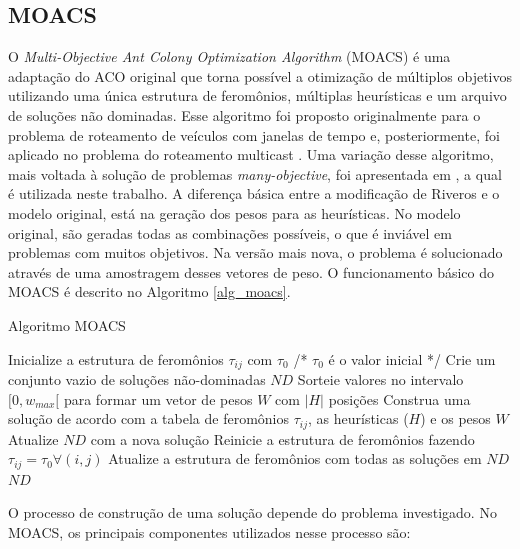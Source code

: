 \subsection{MOACS}

O \textit{Multi-Objective Ant Colony Optimization Algorithm} (MOACS) \cite{Baran2003} é uma adaptação do ACO original que torna possível a otimização de múltiplos objetivos utilizando uma única estrutura de feromônios, múltiplas heurísticas e um arquivo de soluções não dominadas. Esse algoritmo foi proposto originalmente para o problema de roteamento de veículos com janelas de tempo e, posteriormente, foi aplicado no problema do roteamento multicast \cite{Pinto2005}. Uma variação desse algoritmo, mais voltada à solução de problemas \textit{many-objective}, foi apresentada em \cite{Riveros2016}, a qual é utilizada neste trabalho. A diferença básica entre a modificação de Riveros e o modelo original, está na geração dos pesos para as heurísticas. No modelo original, são geradas todas as combinações possíveis, o que é inviável em problemas com muitos objetivos. Na versão mais nova, o problema é solucionado através de uma amostragem desses vetores de peso. O funcionamento básico do MOACS é descrito no Algoritmo \ref{alg_moacs}.

\begin{algorithm}
	\caption{Algoritmo MOACS}
	\label{alg_moacs}
	\begin{algorithmic}[1]
		\State Inicialize a estrutura de feromônios $\tau_{ij}$ com $\tau_0$ /* $\tau_{0}$ é o valor inicial */
		\State Crie um conjunto vazio de soluções não-dominadas $ND$
		\State Sorteie valores no intervalo $[0, w_{max}[$ para formar um vetor de pesos $W$ com $|H|$ posições
		\State Construa uma solução de acordo com a tabela de feromônios $\tau_{ij}$, as heurísticas ($H$) e os pesos $W$
		\State Atualize $ND$ com a nova solução
		\EndFor
		\State Reinicie a estrutura de feromônios fazendo $\tau_{ij} = \tau_0 \forall(i,j)$
		\Else
		\State Atualize a estrutura de feromônios com todas as soluções em $ND$
		\EndIf
		\EndWhile
		\State \Return $ND$
	\end{algorithmic}
\end{algorithm}

O processo de construção de uma solução depende do problema investigado. No MOACS, os principais componentes utilizados nesse processo são:

